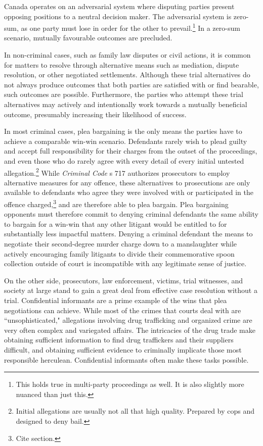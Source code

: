 Canada operates on an adversarial system where disputing parties present opposing positions to a neutral decision maker. The adversarial system is zero-sum, as one party must lose in order for the other to prevail.\footnote{This holds true in multi-party proceedings as well. It is also slightly more nuanced than just this.} In a zero-sum scenario, mutually favourable outcomes are precluded. 

In non-criminal cases, such as family law disputes or civil actions, it is common for matters to resolve through alternative means such as mediation, dispute resolution, or other negotiated settlements. Although these trial alternatives do not always produce outcomes that both parties are satisfied with or find bearable, such outcomes are possible. Furthermore, the parties who attempt these trial alternatives may actively and intentionally work towards a mutually beneficial outcome, presumably increasing their likelihood of success.

In most criminal cases, plea bargaining is the only means the parties have to achieve a comparable win-win scenario. Defendants rarely wish to plead guilty and accept full responsibility for their charges from the outset of the proceedings, and even those who do rarely agree with every detail of every initial untested allegation.\footnote{Initial allegations are usually not all that high quality. Prepared by cops and designed to deny bail.} While \textit{Criminal Code} s 717 authorizes prosecutors to employ alternative measures for any offence, these alternatives to prosecutions are only available to defendants who agree they were involved with or participated in the offence charged,\footnote{Cite section.} and are therefore able to plea bargain. Plea bargaining opponents must therefore commit to denying criminal defendants the same ability to bargain for a win-win that any other litigant would be entitled to for substantially less impactful matters. Denying a criminal defendant the means to negotiate their second-degree murder charge down to a manslaughter while actively encouraging family litigants to divide their commemorative spoon collection outside of court is incompatible with any legitimate sense of justice.

On the other side, prosecutors, law enforcement, victims, trial witnesses, and society at large stand to gain a great deal from effective case resolution without a trial. Confidential informants are a prime example of the wins that plea negotiations can achieve. While most of the crimes that courts deal with are ``unsophisticated," allegations involving drug trafficking and organized crime are very often complex and variegated affairs. The intricacies of the drug trade make obtaining sufficient information to find drug traffickers and their suppliers difficult, and obtaining sufficient evidence to criminally implicate those most responsible herculean. Confidential informants often make these tasks possible.

